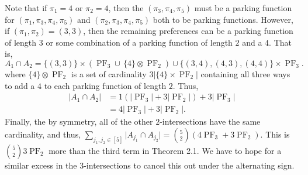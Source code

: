 \begin{example}
	Note that if $\pi_{1} = 4$ or $\pi_{2} = 4$, then the $(\pi_{3}, \pi_{4}, \pi_{5})$ must be a parking function for $(\pi_{1}, \pi_{3}, \pi_{4}, \pi_{5})$ and $(\pi_{2}, \pi_{3}, \pi_{4}, \pi_{5})$ both to be parking functions. However, if $(\pi_{1}, \pi_{2}) = (3, 3)$, then the remaining preferences can be a parking function of length $3$ or some combination of a parking function of length $2$ and a $4$. That is,
	\[
		A_{1} \cap A_{2} = \{ (3, 3) \} \times (\operatorname{PF}_{3} \cup \, \{ 4 \} \otimes \operatorname{PF}_{2}) \cup \{ (3, 4), (4, 3), (4, 4) \} \times \operatorname{PF}_{3}.
	\]
	where $\{ 4 \} \otimes \operatorname{PF}_{2}$ is a set of cardinality $3 \lvert \{ 4 \} \times \operatorname{PF}_{2} \rvert$ containing all three ways to add a $4$ to each parking function of length $2$.  Thus,
	\[
		\begin{split}
			\lvert A_{1} \cap A_{2} \rvert & = 1 (\lvert \operatorname{PF}_{3} \rvert + 3 \lvert \operatorname{PF}_{2} \rvert) + 3 \lvert \operatorname{PF}_{3} \rvert \\
						       & = 4 \lvert \operatorname{PF}_{3} \rvert + 3 \lvert \operatorname{PF}_{2} \rvert.
		\end{split}
	\]
	Finally, the by symmetry, all of the other $2$-intersections have the same cardinality, and thus, $\sum_{j_{1}, j_{2} \in [5]} \lvert A_{j_{1}} \cap A_{j_{2}} \rvert = \binom{5}{2} (4 \operatorname{PF}_{3} + 3 \operatorname{PF}_{2})$. This is $\binom{5}{2} 3 \operatorname{PF}_{2}$ more than the third term in Theorem 2.1. We have to hope for a similar excess in the $3$-intersections to cancel this out under the alternating sign. \\


\end{example}
